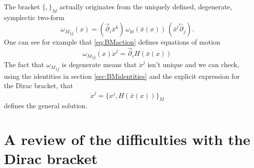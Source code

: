 \documentclass[a4paper,12pt]{article}
\theoremstyle{definition}
\theoremstyle{remark}
\numberwithin{equation}{section}
\newcommand{\om}{\omega}
\newcommand{\bx}{\bar{x}}
\newcommand{\dx}{\dot{x}}
\newcommand{\pl}{\overset{\leftarrow}{\partial}}
\newcommand{\pr}{\overset{\rightarrow}{\partial}}
\begin{document}
The bracket $\{,\}_M$ actually originates from the uniquely
defined, degenerate, symplectic two-form
\begin{equation}\label{eq:omMform}
{\om_M}_{ij}(x)=(\pr_{i}\bx^k) \,\om_{kl}(\bx(x))\,
(\bx^l\pl_{j}).
\end{equation}
One can see for example that \eqref{eq:BMaction} defines equations
of motion
\begin{equation}
{\om_M}_{ij}(x)\dx^j=\pr_i H(\bx(x))
\end{equation}
The fact that ${\om_M}_{ij}$ is degenerate means that $\dx^j$
isn't unique and we can check, using the identities in section
\ref{sec:BMidentities} and the explicit expression for the Dirac
bracket, that
\begin{equation}
\dx^j=\{x^j,H(\bx(x))\}_M
\end{equation}
defines the general solution.


\section{A review of the difficulties with the Dirac bracket}
\label{sec:Diracbracket}
\end{document}
